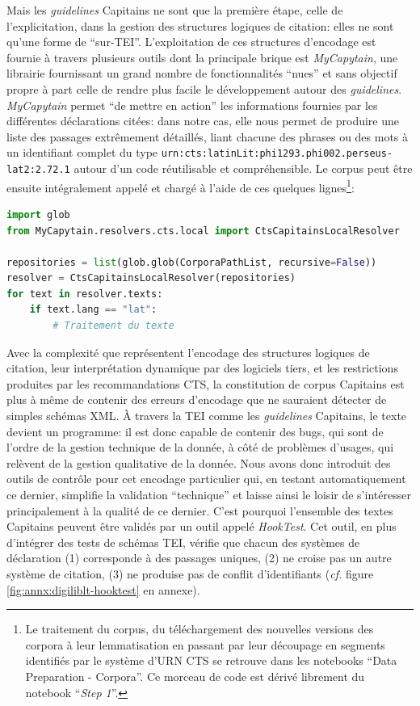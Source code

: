 Mais les \textit{guidelines} Capitains ne sont que la première étape, celle de l'explicitation, dans la gestion des structures logiques de citation: elles ne sont qu'une forme de \enquote{sur-TEI}. L'exploitation de ces structures d'encodage est fournie à travers plusieurs outils dont la principale brique est \textit{MyCapytain}, une librairie fournissant un grand nombre de fonctionnalités \enquote{nues} et sans objectif propre à part celle de rendre plus facile le développement autour des \textit{guidelines}. \textit{MyCapytain} permet \enquote{de mettre en action} les informations fournies par les différentes déclarations citées: dans notre cas, elle nous permet de produire une liste des passages extrêmement détaillés, liant chacune des phrases ou des mots à un identifiant complet du type \texttt{urn:cts:latinLit:phi1293.phi002.perseus-lat2:2.72.1} autour d'un code réutilisable et compréhensible. Le corpus peut être ensuite intégralement appelé et chargé à l'aide de ces quelques lignes\footnote{Le traitement du corpus, du téléchargement des nouvelles versions des corpora à leur lemmatisation en passant par leur découpage en segments identifiés par le système d'URN CTS se retrouve dans les notebooks \enquote{Data Preparation - Corpora}. Ce morceau de code est dérivé librement du notebook \enquote{\textit{Step 1}}.}:

\begin{lstlisting}[language=Python]
import glob
from MyCapytain.resolvers.cts.local import CtsCapitainsLocalResolver

repositories = list(glob.glob(CorporaPathList, recursive=False))
resolver = CtsCapitainsLocalResolver(repositories)
for text in resolver.texts:
    if text.lang == "lat":
        # Traitement du texte
\end{lstlisting}

Avec la complexité que représentent l'encodage des structures logiques de citation, leur interprétation dynamique par des logiciels tiers, et les restrictions produites par les recommandations CTS, la constitution de corpus Capitains est plus à même de contenir des erreurs d'encodage que ne sauraient détecter de simples schémas XML. À travers la TEI comme les \textit{guidelines} Capitains, le texte devient un programme: il est donc capable de contenir des bugs, qui sont de l'ordre de la gestion technique de la donnée, à côté de problèmes d'usages, qui relèvent de la gestion qualitative de la donnée. Nous avons donc introduit des outils de contrôle pour cet encodage particulier qui, en testant automatiquement ce dernier, simplifie la validation \enquote{technique} et laisse ainsi le loisir de s'intéresser principalement à la qualité de ce dernier. C'est pourquoi l'ensemble des textes Capitains peuvent être validés par un outil appelé \textit{HookTest}. Cet outil, en plus d'intégrer des tests de schémas TEI, vérifie que chacun des systèmes de déclaration (1) corresponde à des passages uniques, (2) ne croise pas un autre système de citation, (3) ne produise pas de conflit d'identifiants (\textit{cf.} figure \ref{fig:annx:digiliblt-hooktest} en annexe).

